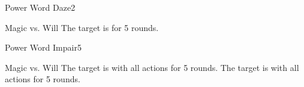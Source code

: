 \begin{spellsection}{Power Word Daze}{2}
    \begin{spellheader}
    \end{spellheader}
    \begin{spellcontent}
        \begin{spelltargetinginfo}
        \end{spelltargetinginfo}
        \begin{spelleffects}
            \begin{spellattack}{Magic vs. Will}
                \spellsuccess The target is \dazed for 5 rounds.
            \end{spellattack}
        \end{spelleffects}
    \end{spellcontent}
    \begin{spellfooter}
        \miscastrandom
    \end{spellfooter}
\end{spellsection}

\begin{spellsection}{Power Word Impair}{5}
    \begin{spellheader}
    \end{spellheader}
    \begin{spellcontent}
        \begin{spelltargetinginfo}
        \end{spelltargetinginfo}
        \begin{spelleffects}
            \begin{spellattack}{Magic vs. Will}
                \spellsuccess The target is \severelyimpaired with all actions for 5 rounds.
                \spellfailure The target is \impaired with all actions for 5 rounds.
            \end{spellattack}
        \end{spelleffects}
    \end{spellcontent}
    \begin{spellfooter}
        \miscastrandom
    \end{spellfooter}
\end{spellsection}

